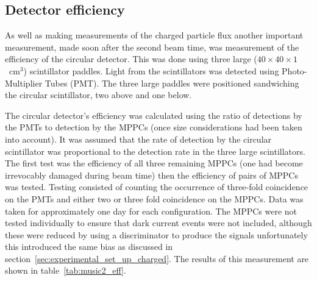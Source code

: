 \subsection{Detector efficiency} %
\label{sec:detector_efficiency}
As well as making measurements of the charged particle flux another important measurement, made soon after the second beam time, was measurement of the efficiency of the circular detector. This was done using three large (\( 40\times40\times1 \)~cm\(^3\)) scintillator paddles. Light from the scintillators was detected using Photo-Multiplier Tubes (PMT). The three large paddles were positioned sandwiching the circular scintillator, two above and one below. 

The circular detector's efficiency was calculated using the ratio of detections by the PMTs to detection by the MPPCs (once size considerations had been taken into account). It was assumed that the rate of detection by the circular scintillator was proportional to the detection rate in the three large scintillators. The first test was the efficiency of all three remaining MPPCs (one had become irrevocably damaged during beam time) then the efficiency of pairs of MPPCs was tested. Testing consisted of counting the occurrence of three-fold coincidence on the PMTs and either two or three fold coincidence on the MPPCs. Data was taken for approximately one day for each configuration. The MPPCs were not tested individually to ensure that dark current events were not included, although these were reduced by using a discriminator to produce the signals unfortunately this introduced the same bias as discussed in section~\ref{sec:experimental_set_up_charged}. The results of this measurement are shown in table~\ref{tab:music2_eff}.

